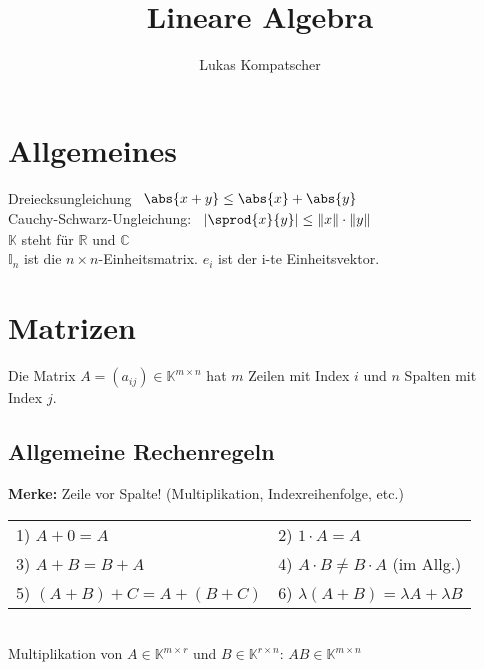 \documentclass[german, 6pt]{latex4ei/latex4ei_sheet}
\title{Lineare Algebra}
\author{Lukas Kompatscher}
\begin{document}
\ifdefined\GitRevision{}\fi
\ifdefined\GitIssuesURL
  \ifdefined\setissueslinkurl
    \setissueslinkurl{\GitIssuesURL} %
  \fi
\fi

\maketitle
\section{Allgemeines} %
\label{sub:allgemeines}

Dreiecksungleichung \qquad \qquad \qquad
\begin{math}\begin{array}{l}
	\abs{x + y} \le \abs{x} + \abs{y}
\end{array}\end{math} \\
Cauchy-Schwarz-Ungleichung: \qquad 
\begin{math}\begin{array}{l}
\left| \sprod{x}{y} \right| \le \| x\| \cdot \| y\|
\end{array}\end{math}\\
$\mathbb{K}$ steht für $\mathbb{R}$ und $\mathbb{C}$\\
$\mathbb{I}_n$ ist die $n\times n$-Einheitsmatrix. \qquad$e_i$ ist der i-te Einheitsvektor.
\section{Matrizen}
Die Matrix $A=(a_{ij}) \in \mathbb K^{m\times n}$ hat $m$ Zeilen mit Index $i$ und $n$ Spalten mit Index $j$.

\subsection{Allgemeine Rechenregeln}
\textbf{Merke:} Zeile vor Spalte! (Multiplikation, Indexreihenfolge, etc.)
\begin{tabular}{ll}	
	1)  $A+0=A$ & 2)  $1 \cdot A=A$ \\
	3)  $A+B=B+A$ & 4) $A \cdot B \ne B \cdot A$ (im Allg.) \\
	5)  $(A+B)+C=A+(B+C)$ & 6) $\lambda (A+B) = \lambda A + \lambda B$\\ 
\end{tabular}\\
Multiplikation von $A\in \mathbb K^{m\times r}$ und $B\in \mathbb K^{r\times n}$: $AB\in\mathbb K^{m\times n}$
\end{document}
